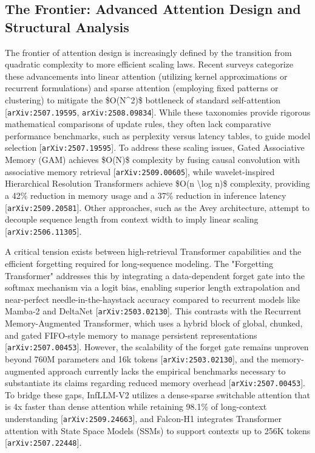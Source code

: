 \documentclass[11pt]{article}
\begin{document}
\subsection{The Frontier: Advanced Attention Design and Structural Analysis}

The frontier of attention design is increasingly defined by the transition from quadratic complexity to more efficient scaling laws. Recent surveys categorize these advancements into linear attention (utilizing kernel approximations or recurrent formulations) and sparse attention (employing fixed patterns or clustering) to mitigate the \$O(N\textasciicircum{}2)\$ bottleneck of standard self-attention [\texttt{arXiv:2507.19595}, \texttt{arXiv:2508.09834}]. While these taxonomies provide rigorous mathematical comparisons of update rules, they often lack comparative performance benchmarks, such as perplexity versus latency tables, to guide model selection [\texttt{arXiv:2507.19595}]. To address these scaling issues, Gated Associative Memory (GAM) achieves \$O(N)\$ complexity by fusing causal convolution with associative memory retrieval [\texttt{arXiv:2509.00605}], while wavelet-inspired Hierarchical Resolution Transformers achieve \$O(n \textbackslash{}log n)\$ complexity, providing a 42\% reduction in memory usage and a 37\% reduction in inference latency [\texttt{arXiv:2509.20581}]. Other approaches, such as the Avey architecture, attempt to decouple sequence length from context width to imply linear scaling [\texttt{arXiv:2506.11305}].

A critical tension exists between high-retrieval Transformer capabilities and the efficient forgetting required for long-sequence modeling. The "Forgetting Transformer" addresses this by integrating a data-dependent forget gate into the softmax mechanism via a logit bias, enabling superior length extrapolation and near-perfect needle-in-the-haystack accuracy compared to recurrent models like Mamba-2 and DeltaNet [\texttt{arXiv:2503.02130}]. This contrasts with the Recurrent Memory-Augmented Transformer, which uses a hybrid block of global, chunked, and gated FIFO-style memory to manage persistent representations [\texttt{arXiv:2507.00453}]. However, the scalability of the forget gate remains unproven beyond 760M parameters and 16k tokens [\texttt{arXiv:2503.02130}], and the memory-augmented approach currently lacks the empirical benchmarks necessary to substantiate its claims regarding reduced memory overhead [\texttt{arXiv:2507.00453}]. To bridge these gaps, InfLLM-V2 utilizes a dense-sparse switchable attention that is 4x faster than dense attention while retaining 98.1\% of long-context understanding [\texttt{arXiv:2509.24663}], and Falcon-H1 integrates Transformer attention with State Space Models (SSMs) to support contexts up to 256K tokens [\texttt{arXiv:2507.22448}].
\end{document}
